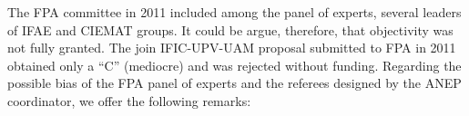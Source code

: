 The FPA committee in 2011 included among the panel of experts, several leaders of IFAE and CIEMAT groups. It could be argue, therefore, that objectivity was not fully granted. 
%
The join IFIC-UPV-UAM proposal submitted to FPA in 2011 obtained only a ``C'' (mediocre) and was rejected without funding. Regarding the possible bias of the FPA panel of experts and the referees designed by the ANEP coordinator, we offer the following remarks:

